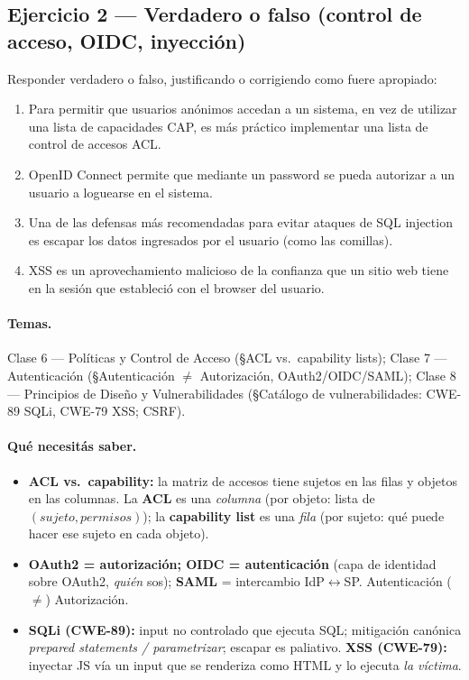 \subsection{Ejercicio 2 — Verdadero o falso (control de acceso, OIDC, inyección)}

\begin{consigna}
Responder verdadero o falso, justificando o corrigiendo como fuere apropiado:
\begin{enumerate}[label=\alph*)]
  \item Para permitir que usuarios anónimos accedan a un sistema, en vez de utilizar una lista
        de capacidades CAP, es más práctico implementar una lista de control de accesos ACL.
  \item OpenID Connect permite que mediante un password se pueda autorizar a un usuario a
        loguearse en el sistema.
  \item Una de las defensas más recomendadas para evitar ataques de SQL injection es escapar
        los datos ingresados por el usuario (como las comillas).
  \item XSS es un aprovechamiento malicioso de la confianza que un sitio web tiene en la sesión
        que estableció con el browser del usuario.
\end{enumerate}
\end{consigna}

\paragraph{Temas.} Clase 6 — Políticas y Control de Acceso (\S ACL vs.\ capability lists);
Clase 7 — Autenticación (\S Autenticación $\neq$ Autorización, OAuth2/OIDC/SAML);
Clase 8 — Principios de Diseño y Vulnerabilidades (\S Catálogo de vulnerabilidades:
CWE-89 SQLi, CWE-79 XSS; CSRF).

\paragraph{Qué necesitás saber.}
\begin{itemize}[leftmargin=1.4em,itemsep=2pt]
  \item \textbf{ACL vs.\ capability:} la matriz de accesos tiene sujetos en las filas y objetos
        en las columnas. La \textbf{ACL} es una \emph{columna} (por objeto: lista de
        $(sujeto, permisos)$); la \textbf{capability list} es una \emph{fila} (por sujeto: qué
        puede hacer ese sujeto en cada objeto).
  \item \textbf{OAuth2 = autorización; OIDC = autenticación} (capa de identidad sobre OAuth2,
        \emph{quién} sos); \textbf{SAML} = intercambio IdP$\leftrightarrow$SP. Autenticación
        ($\neq$) Autorización.
  \item \textbf{SQLi (CWE-89):} input no controlado que ejecuta SQL; mitigación canónica
        \emph{prepared statements / parametrizar}; escapar es paliativo. \textbf{XSS (CWE-79):}
        inyectar JS vía un input que se renderiza como HTML y lo ejecuta \emph{la víctima}.
\end{itemize}

